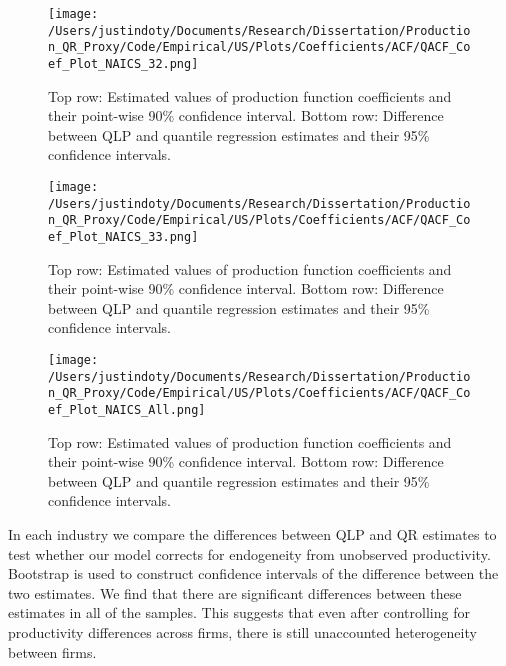 \documentclass[11pt]{article}
\begin{document}
\begin{figure}[H]
\centering
\texttt{[image: /Users/justindoty/Documents/Research/Dissertation/Production\_QR\_Proxy/Code/Empirical/US/Plots/Coefficients/ACF/QACF\_Coef\_Plot\_NAICS\_32.png]}
\caption{Top row: Estimated values of production function coefficients and their point-wise 90\% confidence interval. Bottom row: Difference between QLP and quantile regression estimates and their 95\% confidence intervals.}
\label{fig:32coef}
\end{figure}

\begin{figure}[H]
\centering
\texttt{[image: /Users/justindoty/Documents/Research/Dissertation/Production\_QR\_Proxy/Code/Empirical/US/Plots/Coefficients/ACF/QACF\_Coef\_Plot\_NAICS\_33.png]}
\caption{Top row: Estimated values of production function coefficients and their point-wise 90\% confidence interval. Bottom row: Difference between QLP and quantile regression estimates and their 95\% confidence intervals.}
\label{fig:33coef}
\end{figure}

\begin{figure}[H]
\centering
\texttt{[image: /Users/justindoty/Documents/Research/Dissertation/Production\_QR\_Proxy/Code/Empirical/US/Plots/Coefficients/ACF/QACF\_Coef\_Plot\_NAICS\_All.png]}
\caption{Top row: Estimated values of production function coefficients and their point-wise 90\% confidence interval. Bottom row: Difference between QLP and quantile regression estimates and their 95\% confidence intervals.}
\label{fig:USallcoef}
\end{figure}

In each industry we compare the differences between QLP and QR estimates to test whether our model corrects for endogeneity from unobserved productivity. Bootstrap is used to construct confidence intervals of the difference between the two estimates. We find that there are significant differences between these estimates in all of the samples. This suggests that even after controlling for productivity differences across firms, there is still unaccounted heterogeneity between firms.
\end{document}
